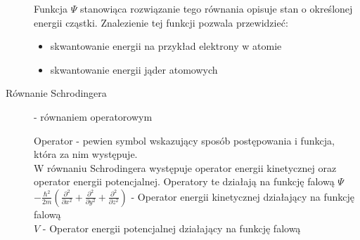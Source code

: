 \documentclass[a4paper,11pt]{article}
\begin{document}
\begin{description}
  Funkcja $\Psi$ stanowiąca rozwiązanie tego równania opisuje stan o określonej energii cząstki. Znalezienie tej funkcji pozwala przewidzieć:
  \begin{itemize}
  \item skwantowanie energii na przykład elektrony w atomie
  \item skwantowanie energii jąder atomowych
  \end{itemize}
\item[Równanie Schrodingera] - równaniem operatorowym
  
  Operator - pewien symbol wskazujący sposób postępowania i funkcja, która za nim występuje.\\
  W równaniu Schrodingera występuje operator energii kinetycznej oraz operator energii potencjalnej. Operatory te działają na funkcję falową $\Psi$\\
  $-\frac{\hbar^2}{2m}\left( \frac{\partial^2}{\partial x^2} + \frac{\partial^2}{\partial y^2} + \frac{\partial^2}{\partial z^2} \right)$ - Operator energii kinetycznej działający na funkcję falową\\
  $V$ - Operator energii potencjalnej działający na funkcję falową


\end{description}
\end{document}
